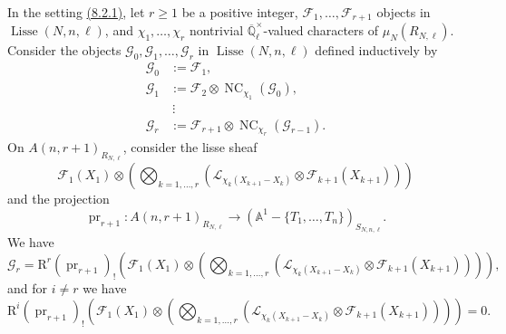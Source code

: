 In the setting \hyperref[par:8.2.1]{(8.2.1)}, let \(r\geq1\) be a positive integer, \(\mathcal{F}_1,\ldots,\mathcal{F}_{r+1}\) objects in \(\operatorname{Lisse}(N,n,\ell)\), and \(\chi_1,\ldots,\chi_r\) nontrivial \(\overline{\mathbb{Q}}_\ell^{\times}\)-valued characters of \(\mu_N(R_{N,\ell})\). Consider the objects \(\mathcal{G}_0,\mathcal{G}_1,\ldots,\mathcal{G}_r\) in \(\operatorname{Lisse}(N,n,\ell)\) defined inductively by
\[
\begin{aligned}
\mathcal{G}_0&:=\mathcal{F}_1,\\
\mathcal{G}_1&:=\mathcal{F}_2\otimes\operatorname{NC}_{\chi_1}(\mathcal{G}_0),\\
&\ \vdots\\
\mathcal{G}_r&:=\mathcal{F}_{r+1}\otimes\operatorname{NC}_{\chi_r}(\mathcal{G}_{r-1}).
\end{aligned}
\]
On \(A(n,r+1)_{R_{N,\ell}}\), consider the lisse sheaf
\[
\mathcal{F}_1(X_1)\otimes\left(\bigotimes_{k=1,\ldots,r}(\mathcal{L}_{\chi_k(X_{k+1}-X_k)}\otimes\mathcal{F}_{k+1}(X_{k+1}))\right)
\]
and the projection
\[
\operatorname{pr}_{r+1}:A(n,r+1)_{R_{N,\ell}}\to(\mathbb{A}^1-\{T_1,\ldots,T_n\})_{S_{N,n,\ell}}.
\]
We have
\[
\mathcal{G}_r=\mathrm{R}^r(\operatorname{pr}_{r+1})_!\left(\mathcal{F}_1(X_1)\otimes\left(\bigotimes_{k=1,\ldots,r}(\mathcal{L}_{\chi_k(X_{k+1}-X_k)}\otimes\mathcal{F}_{k+1}(X_{k+1}))\right)\right),
\]
and for \(i\ne r\) we have
\[
\mathrm{R}^i(\operatorname{pr}_{r+1})_!\left(\mathcal{F}_1(X_1)\otimes\left(\bigotimes_{k=1,\ldots,r}(\mathcal{L}_{\chi_k(X_{k+1}-X_k)}\otimes\mathcal{F}_{k+1}(X_{k+1}))\right)\right)=0.
\]
